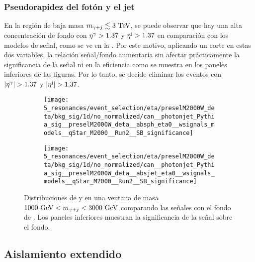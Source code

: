 \subsubsection{Pseudorapidez del fotón y el jet}
\label{subsubsec:evt_selection:sr_opt:eta:etas}

En la región de baja masa \(m_{\gamma+j} \lesssim 3~\text{TeV}\), se puede observar que hay una alta concentración de fondo con \(\eta^{\gamma} > 1.37\) y \(\eta^{\text{j}} > 1.37\) en comparación con los modelos de señal, como se ve en la \Fig{\ref{fig:evt_selection:sr_opt:eta:etas:1d}}. Por este motivo, aplicando un corte en estas dos variables, la relación señal/fondo aumentaría sin afectar prácticamente la significancia de la señal ni en la eficiencia como se muestra en los paneles inferiores de las figuras. Por lo tanto, se decide eliminar los eventos con \(|\eta^{\gamma}| > 1.37\) y \(|\eta^{\text{j}}| > 1.37\).

\begin{figure}[ht!]
    \centering
    \begin{subfigure}[h]{0.49\linewidth}
        \centering
        \texttt{[image: 5\_resonances/event\_selection/eta/preselM2000W\_deta/bkg\_sig/1d/no\_normalized/can\_\_photonjet\_Pythia\_sig\_\_preselM2000W\_deta\_\_absph\_eta0\_\_wsignals\_models\_\_qStar\_M2000\_\_Run2\_\_SB\_significance]}
        \caption{\etagam}
        \label{fig:evt_selection:sr_opt:eta:etas:1d:ph}
    \end{subfigure}
    \hfill
    \begin{subfigure}[h]{0.49\linewidth}
        \centering
        \texttt{[image: 5\_resonances/event\_selection/eta/preselM2000W\_deta/bkg\_sig/1d/no\_normalized/can\_\_photonjet\_Pythia\_sig\_\_preselM2000W\_deta\_\_absjet\_eta0\_\_wsignals\_models\_\_qStar\_M2000\_\_Run2\_\_SB\_significance]}
        \caption{\etajet}
        \label{fig:evt_selection:sr_opt:eta:etas:1d:jet}
    \end{subfigure}
    \caption{Distribuciones de \etagam y \etajet en una ventana de masa \(1000~\text{GeV} < m_{\gamma+j} < 3000~\text{GeV}\) comparando las señales con el fondo de \yj. Los paneles inferiores muestran la significancia de la señal sobre el fondo.}
    \label{fig:evt_selection:sr_opt:eta:etas:1d}
\end{figure}



\subsection{Aislamiento extendido}
\label{subsec:evt_selection:sr_opt:extended_iso}

